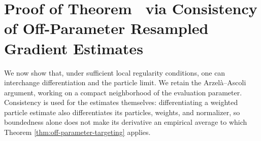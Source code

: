 \section[Strong Consistency of the Undiscounted Score Estimator]{Proof of Theorem~{\thmMopGradConsistency} via Consistency of Off-Parameter Resampled Gradient Estimates}
\label{sec:app07-s5}
\label{appendix:consistency}



We now show that, under sufficient local regularity conditions, one can interchange differentiation and the particle limit. We retain the Arzel\`a--Ascoli argument, working on a compact neighborhood of the evaluation parameter. Consistency is used for the estimates themselves: differentiating a weighted particle estimate also differentiates its particles, weights, and normalizer, so boundedness alone does not make its derivative an empirical average to which Theorem \ref{thm:off-parameter-targeting} applies.

